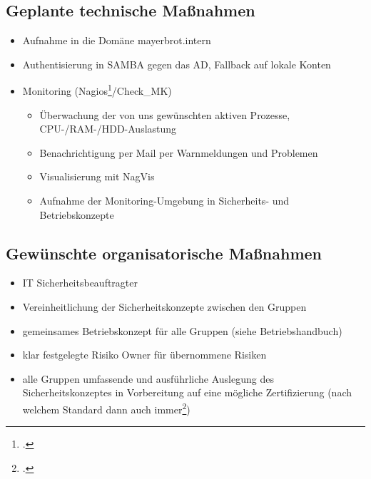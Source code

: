 \subsection{Geplante technische Maßnahmen}
\begin{itemize}
\item Aufnahme in die Domäne mayerbrot.intern
\item Authentisierung in SAMBA gegen das AD, Fallback auf lokale Konten
\item Monitoring (Nagios\footcite{nagios}/Check\_MK)
\begin{itemize}
	\item Überwachung der von uns gewünschten aktiven Prozesse, CPU-/RAM-/HDD-Auslastung
	\item Benachrichtigung per Mail per Warnmeldungen und Problemen
	\item Visualisierung mit NagVis
	\item Aufnahme der Monitoring-Umgebung in Sicherheits- und Betriebskonzepte
\end{itemize}
\end{itemize}

\subsection{Gewünschte organisatorische Maßnahmen}
\begin{itemize}
\item IT Sicherheitsbeauftragter
\item Vereinheitlichung der Sicherheitskonzepte zwischen den Gruppen
\item gemeinsames Betriebskonzept für alle Gruppen (siehe Betriebshandbuch)
\item klar festgelegte Risiko Owner für übernommene Risiken
\item alle Gruppen umfassende und ausführliche Auslegung des Sicherheitskonzeptes in Vorbereitung auf eine mögliche Zertifizierung (nach welchem Standard dann auch immer\footcite{wikiCyberSecStandards})
\end{itemize}

